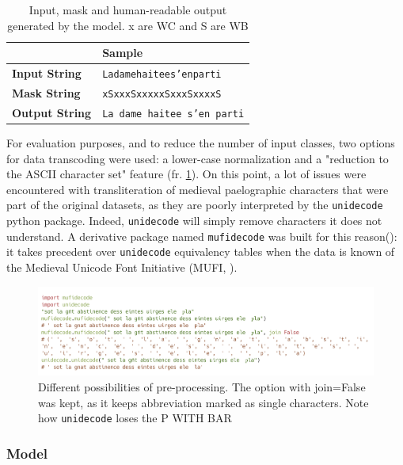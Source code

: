 \documentclass{jdmdh}
\begin{document}
\begin{table}[!ht]
\centering
\begin{tabular}{@{}ll@{}}
\hline
                       & \textbf{Sample}           \\  \hline
\textbf{Input  String} & \texttt{Ladamehaitees'enparti}     \\
\textbf{Mask   String} & \texttt{xSxxxSxxxxxSxxxSxxxxS}     \\
\textbf{Output String} & \texttt{La dame haitee s'en parti} \\ \hline
\end{tabular}
  \caption{Input, mask and human-readable output generated by the model. x are WC and S are WB}
  \label{lst:input_output_example}
\end{table}

For evaluation purposes, and to reduce the number of input classes, two options for data transcoding were used: a lower-case normalization and a "reduction to the ASCII character set" feature (fr. \ref{fig:normalization}). On this point, a lot of issues were encountered with transliteration of medieval paelographic characters that were part of the original datasets, as they are poorly interpreted by the \texttt{unidecode} python package. Indeed, \texttt{unidecode} will simply remove characters it does not understand. A derivative package named \texttt{mufidecode} was built for this reason(\citet{thibault_clerice_2019_3237731}): it takes precedent over \texttt{unidecode} equivalency tables when the data is known of the Medieval Unicode Font Initiative (MUFI, \citet{mufi}).

\begin{figure}[!ht]
  \centering
  \includegraphics[width=\linewidth]{carbon.png}
  \caption{Different possibilities of pre-processing. The option with join=False was kept, as it keeps abbreviation marked as single characters. Note how \texttt{unidecode} loses the P WITH BAR}
  \label{fig:normalization}
\end{figure}

\subsubsection{Model}
\end{document}
